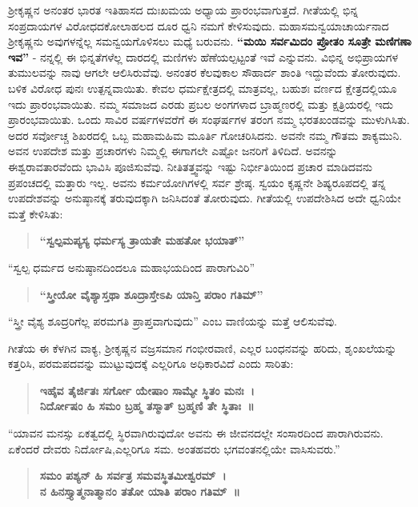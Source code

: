 ಶ‍್ರೀಕೃಷ್ಣನ ಅನಂತರ ಭಾರತ ಇತಿಹಾಸದ ದುಃಖಮಯ ಅಧ್ಯಾಯ ಪ್ರಾರಂಭವಾಗುತ್ತದೆ. ಗೀತೆಯಲ್ಲಿ ಭಿನ್ನ ಸಂಪ್ರದಾಯಗಳ ವಿರೋಧದ\break ಕೋಲಾಹಲದ ದೂರ ಧ್ವನಿ ನಮಗೆ ಕೇಳಿಸುವುದು. ಮಹಾಸಮನ್ವಯಾಚಾರ್ಯನಾದ ಶ‍್ರೀಕೃಷ್ಣನು ಅವುಗಳನ್ನೆಲ್ಲ ಸಮನ್ವಯಗೊಳಿಸಲು ಮಧ್ಯೆ ಬರುವನು. \textbf{“ಮಯಿ ಸರ್ವಮಿದಂ ಪ್ರೋತಂ ಸೂತ್ರೇ ಮಣಿಗಣಾ ಇವ”} - ನನ್ನಲ್ಲಿ ಈ ಭಿನ್ನತೆಗಳೆಲ್ಲ ದಾರದಲ್ಲಿ ಮಣಿಗಳು ಹೆಣೆಯಲ್ಪಟ್ಟಂತೆ ಇವೆ ಎನ್ನುವನು. ವಿಭಿನ್ನ ಅಭಿಪ್ರಾಯಗಳ ತುಮುಲವನ್ನು ನಾವು ಆಗಲೇ ಆಲಿಸಿರುವೆವು. ಅನಂತರ ಕೆಲವುಕಾಲ ಸೌಹಾರ್ದ ಶಾಂತಿ ಇದ್ದುವೆಂದು ತೋರುವುದು. ಬಳಿಕ ವಿರೋಧ ಪುನಃ ಉತ್ಪನ್ನವಾಯಿತು. ಕೇವಲ ಧರ್ಮಕ್ಷೇತ್ರದಲ್ಲಿ ಮಾತ್ರವಲ್ಲ, ಬಹುಶಃ ವರ್ಣದ ಕ್ಷೇತ್ರದಲ್ಲಿಯೂ ಇದು ಪ್ರಾರಂಭವಾಯಿತು. ನಮ್ಮ ಸಮಾಜದ ಎರಡು ಪ್ರಬಲ ಅಂಗಗಳಾದ ಬ್ರಾಹ್ಮಣರಲ್ಲಿ ಮತ್ತು ಕ್ಷತ್ರಿಯರಲ್ಲಿ ಇದು ಪ್ರಾರಂಭವಾಯಿತು. ಒಂದು ಸಾವಿರ ವರ್ಷಗಳವರೆಗೆ ಈ ಸಂಘರ್ಷಗಳ ತರಂಗ ನಮ್ಮ ಭರತಖಂಡವನ್ನು ಮುಳುಗಿಸಿತು. ಅದರ ಸರ್ವೋಚ್ಚ ಶಿಖರದಲ್ಲಿ ಒಬ್ಬ ಮಹಾಮಹಿಮ ಮೂರ್ತಿ ಗೋಚರಿಸಿದನು. ಅವನೇ ನಮ್ಮ ಗೌತಮ ಶಾಕ್ಯಮುನಿ. ಅವನ ಉಪದೇಶ ಮತ್ತು ಪ್ರಚಾರಗಳು ನಿಮ್ಮಲ್ಲಿ ಈಗಾಗಲೇ ಎಷ್ಟೋ ಜನರಿಗೆ ತಿಳಿದಿದೆ. ಅವನನ್ನು ಈಶ್ವರಾವತಾರವೆಂದು ಭಾವಿಸಿ ಪೂಜಿಸುವೆವು. ನೀತಿತತ್ತ್ವವನ್ನು ಇಷ್ಟು ನಿರ್ಭೀತಿಯಿಂದ ಪ್ರಚಾರ ಮಾಡಿದವನು ಪ್ರಪಂಚದಲ್ಲಿ ಮತ್ತಾರು ಇಲ್ಲ. ಅವನು ಕರ್ಮಯೋಗಿಗಳಲ್ಲಿ ಸರ್ವ ಶ್ರೇಷ್ಠ. ಸ್ವಯಂ ಕೃಷ್ಣನೇ ಶಿಷ್ಯರೂಪದಲ್ಲಿ ತನ್ನ ಉಪದೇಶವನ್ನು ಅನುಷ್ಠಾನಕ್ಕೆ ತರುವುದಕ್ಕಾಗಿ ಜನಿಸಿದಂತೆ ತೋರುವುದು. ಗೀತೆಯಲ್ಲಿ ಉಪದೇಶಿಸಿದ ಅದೇ ಧ್ವನಿಯೇ ಮತ್ತೆ ಕೇಳಿಸಿತು:

\begin{verse}
\textbf{“ಸ್ವಲ್ಪಮಪ್ಯಸ್ಯ ಧರ್ಮಸ್ಯ ತ್ರಾಯತೇ ಮಹತೋ ಭಯಾತ್​”}
\end{verse}

“ಸ್ವಲ್ಪ ಧರ್ಮದ ಅನುಷ್ಠಾನದಿಂದಲೂ ಮಹಾಭಯದಿಂದ ಪಾರಾಗುವಿರಿ”

\begin{verse}
\textbf{“ಸ್ತ್ರೀಯೋ ವೈಶ್ಯಾಸ್ತಥಾ ಶೂದ್ರಾಸ್ತೇಽಪಿ ಯಾನ್ತಿ ಪರಾಂ ಗತಿಮ್”​}
\end{verse}

“ಸ್ತ್ರೀ ವೈಶ್ಯ ಶೂದ್ರರಿಗೆಲ್ಲ ಪರಮಗತಿ ಪ್ರಾಪ್ತವಾಗುವುದು” ಎಂಬ ವಾಣಿಯನ್ನು ಮತ್ತೆ ಆಲಿಸುವೆವು.

ಗೀತೆಯ ಈ ಕೆಳಗಿನ ವಾಕ್ಯ, ಶ‍್ರೀಕೃಷ್ಣನ ವಜ್ರಸಮಾನ ಗಂಭೀರವಾಣಿ, ಎಲ್ಲರ ಬಂಧನವನ್ನು ಹರಿದು, ಶೃಂಖಲೆಯನ್ನು ಕತ್ತರಿಸಿ, ಪರಮಪದವನ್ನು ಮುಟ್ಟುವುದಕ್ಕೆ ಎಲ್ಲರಿಗೂ ಅಧಿಕಾರವಿದೆ ಎಂದು ಸಾರಿತು:

\begin{verse}
\textbf{ಇಹೈವ ತೈರ್ಜಿತಃ ಸರ್ಗೋ ಯೇಷಾಂ ಸಾಮ್ಯೇ ಸ್ಥಿತಂ ಮನಃ~।}\\\textbf{ನಿರ್ದೋಷಂ ಹಿ ಸಮಂ ಬ್ರಹ್ಮ ತಸ್ಮಾತ್​ ಬ್ರಹ್ಮಣಿ ತೇ ಸ್ಥಿತಾಃ~॥}
\end{verse}

“ಯಾವನ ಮನಸ್ಸು ಏಕತ್ವದಲ್ಲಿ ಸ್ಥಿರವಾಗಿರುವುದೋ ಅವನು ಈ ಜೀವನದಲ್ಲೇ ಸಂಸಾರದಿಂದ ಪಾರಾಗಿರುವನು. ಏಕೆಂದರೆ ದೇವರು ನಿರ್ದೋಷಿ,\break ಎಲ್ಲರಿಗೂ ಸಮ. ಅಂತಹವರು ಭಗವಂತನಲ್ಲಿಯೇ ವಾಸಿಸುವರು.”

\begin{verse}
\textbf{ಸಮಂ ಪಶ್ಯನ್​ ಹಿ ಸರ್ವತ್ರ ಸಮವಸ್ಥಿತಮೀಶ್ವರಮ್​~।}\\\textbf{ನ ಹಿನಸ್ತ್ಯಾತ್ಮನಾತ್ಮಾನಂ ತತೋ ಯಾತಿ ಪರಾಂ ಗತಿಮ್​~॥}
\end{verse}


